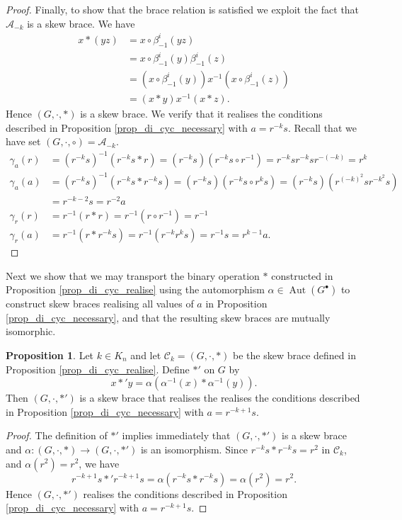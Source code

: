 \documentclass[reqno]{amsart}
\theoremstyle{definition}
\newtheorem{proposition}[theorem]{Proposition}
\DeclareMathOperator{\Aut}{\mbox{Aut}}
\begin{document}
\begin{proof}
Finally, to show that the brace relation is satisfied we exploit the fact that $ \mathscr{A}_{-k} $ is a skew brace. We have
\begin{align*}
x \ast (yz) &= x \circ \beta_{-1}^{i}(yz) \\
&= x \circ \beta_{-1}^{i}(y)\beta_{-1}^{i}(z) \\
&= (x \circ \beta_{-1}^{i}(y))x^{-1}(x \circ \beta_{-1}^{i}(z)) \\
&= (x \ast y)x^{-1}(x \ast z). 
\end{align*}
Hence $ (G,\cdot,\ast) $ is a skew brace. We verify that it realises the conditions described in Proposition \ref{prop_di_cyc_necessary} with $ a=r^{-k}s $. Recall that we have set $ (G,\cdot,\circ) = \mathscr{A}_{-k} $.
\begin{align*}
\gamma_{a}(r) &= (r^{-k}s)^{-1}(r^{-k}s \ast r) = (r^{-k}s)(r^{-k}s \circ r^{-1}) = r^{-k}s r^{-k} s r^{-(-k)} = r^{k} \\
%
\gamma_{a}(a) &= (r^{-k}s)^{-1}(r^{-k}s \ast r^{-k}s) = (r^{-k}s)(r^{-k}s \circ r^{k}s)= (r^{-k}s)(r^{(-k)^{2}}s r^{-k^{2}}s) \\
& = r^{-k-2}s = r^{-2} a \\
%
\gamma_{r}(r) &= r^{-1}(r \ast r) = r^{-1}(r \circ r^{-1}) = r^{-1} \\
%
\gamma_{r}(a) &= r^{-1}(r \ast r^{-k}s) = r^{-1}( r^{-k} r^{k}s ) = r^{-1}s = r^{k-1}a.
\end{align*}
\end{proof}

Next we show that we may transport the binary operation $ \ast $ constructed in Proposition \ref{prop_di_cyc_realise} using the automorphism $ \alpha \in \Aut(G^{\bullet}) $ to construct skew braces realising all values of $ a $ in Proposition \ref{prop_di_cyc_necessary}, and that the resulting skew braces are mutually isomorphic. 

\begin{proposition} \label{prop_di_cyc_isomorphism_1}
Let $ k \in K_{n} $ and let $ \mathscr{C}_{k} = (G,\cdot,\ast) $ be the skew brace defined in Proposition \ref{prop_di_cyc_realise}. Define $ \ast' $ on  $ G $ by
\[ x \ast' y = \alpha(\alpha^{-1}(x) \ast \alpha^{-1}(y)). \]
Then $ (G,\cdot,\ast') $ is a skew brace that realises the realises the conditions described in Proposition \ref{prop_di_cyc_necessary} with $ a=r^{-k+1}s $.
\end{proposition}
\begin{proof}
The definition of $ \ast' $ implies immediately that $ (G,\cdot,\ast') $ is a skew brace and $ \alpha : (G,\cdot,\ast) \rightarrow (G,\cdot,\ast') $ is an isomorphism. Since $ r^{-k}s \ast r^{-k}s = r^{2} $ in $ \mathscr{C}_{k} $, and $ \alpha(r^{2})=r^{2} $, we have 
\[ r^{-k+1}s \ast' r^{-k+1}s = \alpha( r^{-k}s \ast r^{-k}s ) = \alpha(r^{2}) = r^{2}. \]
Hence $ (G,\cdot,\ast') $ realises the conditions described in Proposition \ref{prop_di_cyc_necessary} with $ a=r^{-k+1}s $. 
\end{proof}
\end{document}
